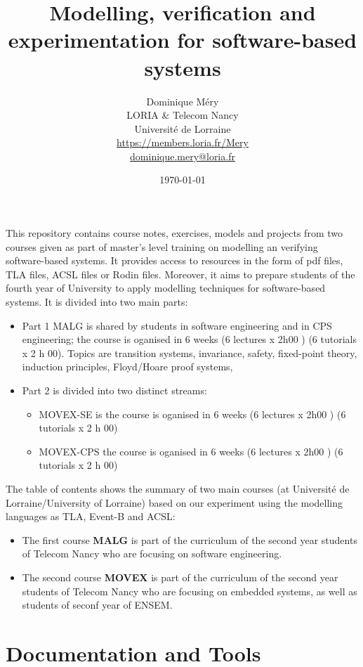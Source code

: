 \documentclass[ 12pt]{article}
\title{Modelling,  verification   and experimentation  for  software-based systems}
\author{Dominique M\'ery\\
LORIA \& Telecom Nancy\\ Universit\'e de Lorraine\\
\url{https://members.loria.fr/Mery}\\ \url{dominique.mery@loria.fr}}
\date{\today}
\begin{document}
  \setcounter{ex}{1}
\maketitle

This repository contains course notes, exercises, models and projects
from two  courses given as part of master's level training on
modelling an verifying software-based systems. It provides access to
resources in the form of pdf files, TLA files, ACSL files  or Rodin
files. Moreover, it aims to prepare  students of the fourth year of
University to apply modelling techniques  for software-based systems.
It is divided into  two  main  parts:
\begin{itemize}
\item Part 1  \textsf{MALG} is shared by students in software engineering and in
 CPS engineering; the course is oganised  in 6 weeks (6 lectures x 
 2h00 ) (6 tutorials x 2 h 00). Topics are  transition systems,
 invariance, safety, fixed-point theory, induction principles,
 Floyd/Hoare proof systems, 
\item Part 2 is divided into  two distinct streams:
  \begin{itemize}
  \item \textsf{MOVEX-SE} is the course is oganised  in 6 weeks (6 lectures x 
 2h00 ) (6 tutorials x 2 h 00)
  \item  \textsf{MOVEX-CPS} the course is oganised  in 6 weeks (6 lectures x 
 2h00 ) (6 tutorials x 2 h 00)
  \end{itemize}
\end{itemize}

The table
of contents shows the  summary of  two main courses (at Université de 
 Lorraine/University of Lorraine)  based on our
 experiment using the modelling languages as TLA,   Event-B  and ACSL:
 
\begin{itemize}
\item The first course \textbf{MALG} is part of the curriculum of the
  second  year
  students of Telecom Nancy  who are  focusing on software
  engineering.
\item  The second course  \textbf{MOVEX}  is part of the curriculum of the
  second  year
  students of Telecom Nancy  who are  focusing on embedded systems, as
  well as students of seconf year of ENSEM. 
\end{itemize}


\tableofcontents


\section{Documentation and Tools}
\end{document}
